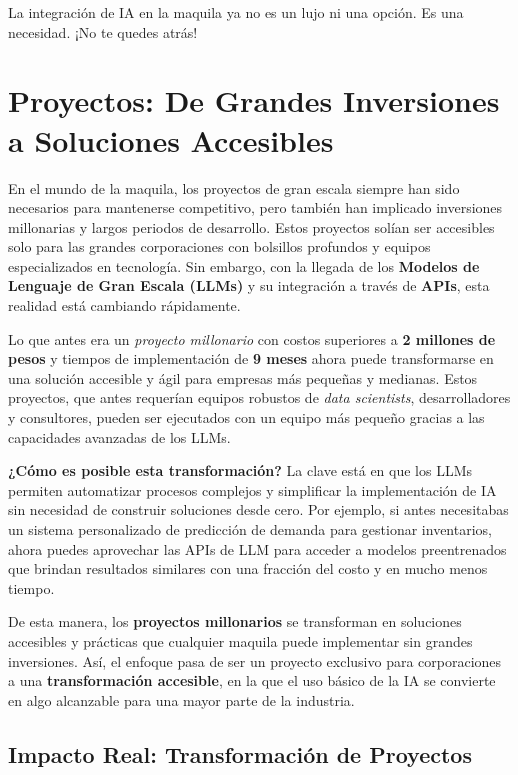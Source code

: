 La integración de IA en la maquila ya no es un lujo ni una opción. Es una necesidad. ¡No te quedes atrás!
\section{Proyectos: De Grandes Inversiones a Soluciones Accesibles}

En el mundo de la maquila, los proyectos de gran escala siempre han sido necesarios para mantenerse competitivo, pero también han implicado inversiones millonarias y largos periodos de desarrollo. Estos proyectos solían ser accesibles solo para las grandes corporaciones con bolsillos profundos y equipos especializados en tecnología. Sin embargo, con la llegada de los \textbf{Modelos de Lenguaje de Gran Escala (LLMs)} y su integración a través de \textbf{APIs}, esta realidad está cambiando rápidamente.

Lo que antes era un \textit{proyecto millonario} con costos superiores a \textbf{2 millones de pesos} y tiempos de implementación de \textbf{9 meses} ahora puede transformarse en una solución accesible y ágil para empresas más pequeñas y medianas. Estos proyectos, que antes requerían equipos robustos de \textit{data scientists}, desarrolladores y consultores, pueden ser ejecutados con un equipo más pequeño gracias a las capacidades avanzadas de los LLMs.

\textbf{¿Cómo es posible esta transformación?} La clave está en que los LLMs permiten automatizar procesos complejos y simplificar la implementación de IA sin necesidad de construir soluciones desde cero. Por ejemplo, si antes necesitabas un sistema personalizado de predicción de demanda para gestionar inventarios, ahora puedes aprovechar las APIs de LLM para acceder a modelos preentrenados que brindan resultados similares con una fracción del costo y en mucho menos tiempo.

De esta manera, los \textbf{proyectos millonarios} se transforman en soluciones accesibles y prácticas que cualquier maquila puede implementar sin grandes inversiones. Así, el enfoque pasa de ser un proyecto exclusivo para corporaciones a una \textbf{transformación accesible}, en la que el uso básico de la IA se convierte en algo alcanzable para una mayor parte de la industria.

\subsection{Impacto Real: Transformación de Proyectos}

